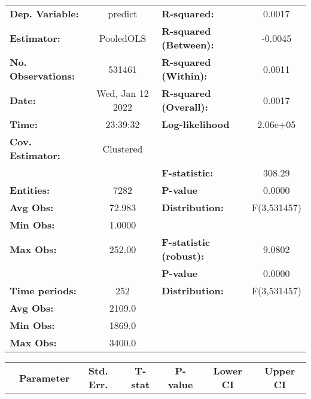 \begin{center}
\begin{tabular}{lclc}
\toprule
\textbf{Dep. Variable:}    &      predict       & \textbf{  R-squared:         }   &      0.0017      \\
\textbf{Estimator:}        &     PooledOLS      & \textbf{  R-squared (Between):}  &     -0.0045      \\
\textbf{No. Observations:} &       531461       & \textbf{  R-squared (Within):}   &      0.0011      \\
\textbf{Date:}             &  Wed, Jan 12 2022  & \textbf{  R-squared (Overall):}  &      0.0017      \\
\textbf{Time:}             &      23:39:32      & \textbf{  Log-likelihood     }   &     2.06e+05     \\
\textbf{Cov. Estimator:}   &     Clustered      & \textbf{                     }   &                  \\
\textbf{}                  &                    & \textbf{  F-statistic:       }   &      308.29      \\
\textbf{Entities:}         &        7282        & \textbf{  P-value            }   &      0.0000      \\
\textbf{Avg Obs:}          &       72.983       & \textbf{  Distribution:      }   &   F(3,531457)    \\
\textbf{Min Obs:}          &       1.0000       & \textbf{                     }   &                  \\
\textbf{Max Obs:}          &       252.00       & \textbf{  F-statistic (robust):} &      9.0802      \\
\textbf{}                  &                    & \textbf{  P-value            }   &      0.0000      \\
\textbf{Time periods:}     &        252         & \textbf{  Distribution:      }   &   F(3,531457)    \\
\textbf{Avg Obs:}          &       2109.0       & \textbf{                     }   &                  \\
\textbf{Min Obs:}          &       1869.0       & \textbf{                     }   &                  \\
\textbf{Max Obs:}          &       3400.0       & \textbf{                     }   &                  \\
\bottomrule
\end{tabular}
\begin{tabular}{lcccccc}
                & \textbf{Parameter} & \textbf{Std. Err.} & \textbf{T-stat} & \textbf{P-value} & \textbf{Lower CI} & \textbf{Upper CI}  \\

\end{tabular}
\end{center}
